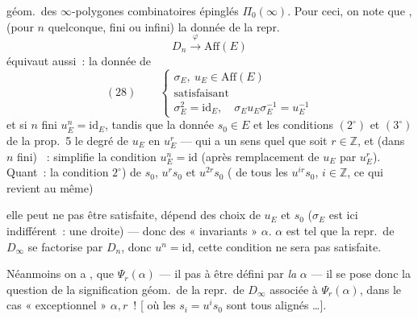 \documentclass[11pt,a4paper]{article}
\begin{document}
géom.\ des $\infty$-polygones combinatoires épinglés $\Pi_0(\infty)$. Pour ceci, on note que , \struck{\ill{} \ill{} \ill{}, \ill{} \ill{}}  (pour $n$ quelconque, fini ou infini) la donnée de la repr.
\[
  D_n \xrightarrow{\ \varphi\ } \mathrm{Aff}(E)
\]
équivaut aussi~: la donnée de
\[
  (28)\qquad
  \begin{cases}
    \sigma_E,\ u_E \in \mathrm{Aff}(E) \\
    \text{satisfaisant} \\
    \sigma_E^{2} = \mathrm{id}_E ,\quad \sigma_E u_E \sigma_E^{-1} = u_E^{-1}
  \end{cases}
\]
et si $n$ fini $u_E^{n} = \mathrm{id}_E$,
tandis que la donnée $s_0 \in E$  et les conditions $(2^{\circ})$ et $(3^{\circ})$ \struck{\ill{}} de la prop.~5  \struck{\ill{} \ill{} \ill{}}  le degré de $u_E$ en $u_E^{r}$ --- qui a un sens quel que soit $r \in \mathbb{Z}$, et (dans $n$ fini) ~: simplifie la condition $u_E^{n} = \mathrm{id}$ (après remplacement de $u_E$ par $u_E^{r}$). \struck{\ill{}} Quant~: la condition $2^{\circ}$)  de $s_0$, $u^{r} s_0$ et $u^{2r} s_0$ ( de tous les $u^{ir} s_0$, $i \in \mathbb{Z}$, ce qui revient au même)

elle peut ne pas être satisfaite,   dépend des choix de $u_E$ et $s_0$ ($\sigma_E$ est ici indifférent~: une droite) --- donc des « invariants » $\alpha$.   $\alpha$ est tel que la repr.\ de $D_\infty$ se factorise par $D_n$, donc $u^{n} = \mathrm{id}$, cette condition ne sera pas satisfaite.

Néanmoins on a , \add{\uncertain{\ill{}}} que $\Psi_r(\alpha)$ --- il  pas à être défini par \emph{la} $\alpha$ --- il se pose donc la question de la signification géom.\ de  la repr.\ de $D_\infty$ associée à $\Psi_r(\alpha)$, dans le cas « exceptionnel » $\alpha, r$~! [\struck{\ill{}}  où les $s_i = u^{i} s_0$ sont tous alignés …].
\marginal{\ill{} \ill{} \ill{}}
\end{document}
